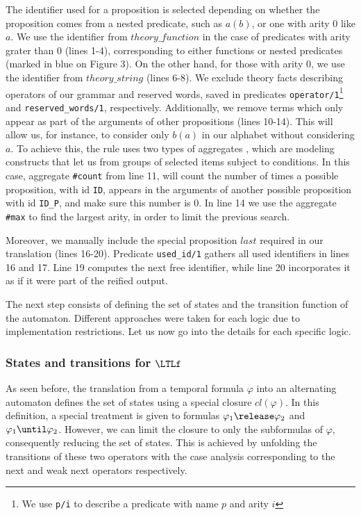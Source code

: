 The identifier used for a proposition is selected depending on whether the proposition comes from a nested predicate, such as $a(b)$, or one with arity 0 like $a$.
We use the identifier from $theory\_function$ in the case of predicates with arity grater than 0 (lines 1-4), corresponding to either functions or nested predicates (marked in blue on Figure 3).
On the other hand, for those with arity 0, we use the identifier from $theory\_string$ (lines 6-8). 
We exclude theory facts describing operators of our grammar and reserved words, saved in predicates \texttt{operator/1}\footnote{We use \texttt{p/i} to describe a predicate with name $p$ and arity $i$} and \texttt{reserved\_words/1}, respectively. 
Additionally, we remove terms which only appear as part of the arguments of other propositions (lines 10-14). 
This will allow us, for instance, to consider only $b(a)$ in our alphabet without considering $a$.
To achieve this, the rule uses two types of aggregates \cite{potasscoManual}, which are modeling constructs that let us from groups of selected items subject to conditions. 
In this case, aggregate \texttt{\#count} from line 11, will count the number of times a possible proposition, with id \texttt{ID}, appears in the arguments of another possible proposition with id \texttt{ID\_P}, and make sure this number is 0. 
In line 14 we use the aggregate \texttt{\#max} to find the largest arity, in order to limit the previous search.


Moreover, we manually include the special proposition $\mathit{last}$ required in our translation (lines 16-20). Predicate \texttt{used\_id/1} gathers all used identifiers in lines 16 and 17. Line 19 computes the next free identifier, while line 20 incorporates it as if it were part of the reified output.


The next step consists of defining the set of states and the transition function of the automaton. 
Different approaches were taken for each logic due to implementation restrictions. Let us now go into the details for each specific logic. 



\subsubsection{States and transitions for $\LTLf$}

As seen before, the translation from a temporal formula $\varphi$ into an alternating automaton defines the set of states using a special closure $cl(\varphi)$. 
In this definition, a special treatment is given to formulas $\varphi_1\release\varphi_2$ and $\varphi_1\until\varphi_2$. 
However, we can limit the closure to only the subformulas of $\varphi$, consequently reducing the set of states. 
This is achieved by unfolding the transitions of these two operators with the case analysis corresponding to the next and weak next operators respectively. 


